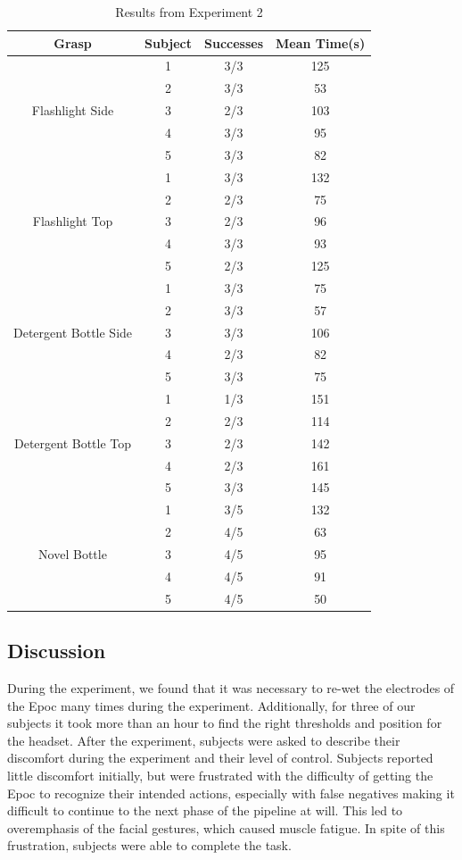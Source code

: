 \begin{table}
\centering
\begin{tabular}{ | c | c | c | c | }
\hline
Grasp & Subject & Successes & Mean Time(s) \\ \hline 
\multirow{5}{*}{Flashlight Side} & 1 & 3/3 & 125 \\ 
& 2 & 3/3 & 53 \\ 
& 3 & 2/3 & 103 \\
& 4 & 3/3 & 95 \\
& 5 & 3/3 & 82 \\ \hline
\multirow{5}{*}{Flashlight Top} & 1 & 3/3 & 132 \\ 
& 2 & 2/3 & 75 \\ 
& 3 & 2/3 & 96 \\
& 4 & 3/3 & 93 \\
& 5 & 2/3 & 125 \\ \hline
\multirow{5}{*}{Detergent Bottle Side} & 1 & 3/3 & 75 \\ 
& 2 & 3/3 & 57 \\ 
& 3 & 3/3 & 106 \\
& 4 & 2/3 & 82 \\
& 5 & 3/3 & 75 \\ \hline
\multirow{5}{*}{Detergent Bottle Top} & 1 & 1/3 & 151 \\ 
& 2 & 2/3 & 114 \\ 
& 3 & 2/3 & 142\\
& 4 & 2/3 & 161 \\
& 5 & 3/3 & 145 \\ \hline
\multirow{5}{*}{Novel Bottle} & 1 & 3/5 & 132 \\
&2 & 4/5 & 63\\
&3 & 4/5 & 95\\
&4 & 4/5 & 91\\
&5 & 4/5 & 50\\
\hline\end{tabular}
\caption{Results from Experiment 2}
\label{tab:results_2}
\end{table}

\subsection{Discussion}
During the experiment, we found that it was necessary to re-wet the electrodes of the Epoc many times during the experiment. Additionally, for three of our subjects it took more than an hour to find the right thresholds and position for the headset. After the experiment, subjects were asked to describe their discomfort during the experiment and their level of control. Subjects reported little discomfort initially, but were frustrated with the difficulty of getting the Epoc to recognize their intended actions, especially with false negatives making it difficult to continue to the next phase of the pipeline at will. This led to overemphasis of the facial gestures, which caused muscle fatigue. In spite of this frustration, subjects were able to complete the task. 

